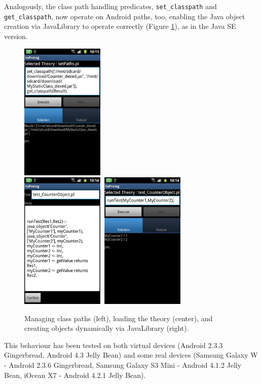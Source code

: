 Analogously, the class path handling predicates, \texttt{set\_classpath} and \texttt{get\_classpath}, now operate on Android paths, too, enabling the Java object creation via JavaLibrary to operate correctly (Figure \ref{fig:android12}), as in the Java SE version.
%
\begin{figure}
\centering
  \includegraphics[height=250px]{images/android12.png} \includegraphics[height=250px]{images/android13.png}
  \caption{Managing class paths (left), loading the theory (center), and creating objects dynamically via JavaLibrary (right).}\label{fig:android12}
\end{figure}

This behaviour has been tested on both virtual devices (Android 2.3.3 Gingerbread, Android 4.3 Jelly Bean) and some real devices (Samsung Galaxy W - Android 2.3.6 Gingerbread, Samsung Galaxy S3 Mini - Android 4.1.2 Jelly Bean, iOcean X7 - Android 4.2.1 Jelly Bean).


